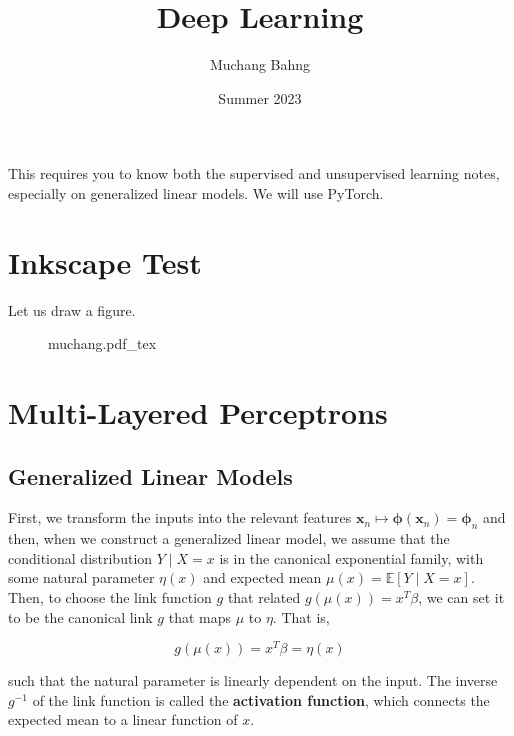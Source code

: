 \documentclass{article}
\newcommand{\incfig}[2][1]{%
    \def\svgwidth{#1\columnwidth}
    {#2.pdf_tex}
  }
\theoremstyle{definition}
\theoremstyle{remark}
\theoremstyle{definition}
\begin{document}
\pagestyle{fancy}

\cfoot{\thepage / \pageref{LastPage}}

\title{Deep Learning}
\author{Muchang Bahng}
\date{Summer 2023}

\maketitle

\tableofcontents

\pagebreak 

This requires you to know both the supervised and unsupervised learning notes, especially on generalized linear models. We will use PyTorch. 

\section{Inkscape Test} Let us draw a figure. 

  \begin{figure}[ht]
    \centering
    \incfig{muchang}
    \caption{}
    \label{fig:muchang}
  \end{figure}

\section{Multi-Layered Perceptrons}

  \subsection{Generalized Linear Models}

     First, we transform the inputs into the relevant features $\mathbf{x}_n \mapsto \boldsymbol{\phi} (\mathbf{x}_n) = \boldsymbol{\phi}_n$ and then, when we construct a generalized linear model, we assume that the conditional distribution $Y \mid X = x$ is in the canonical exponential family, with some natural parameter $\eta(x)$ and expected mean $\mu(x) = \mathbb{E}[Y \mid X = x]$. Then, to choose the link function $g$ that related $g(\mu(x)) = x^T \beta$, we can set it to be the canonical link $g$ that maps $\mu$ to $\eta$. That is, 
    
    \[g(\mu(x)) = x^T \beta = \eta (x)\]

    such that the natural parameter is linearly dependent on the input. The inverse $g^{-1}$ of the link function is called the \textbf{activation function}, which connects the expected mean to a linear function of $x$. 
\end{document}
